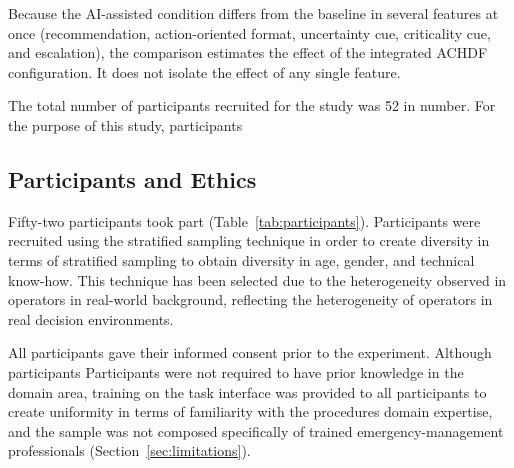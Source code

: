 \documentclass[journal]{IEEEtran}
\theoremstyle{plain}
\theoremstyle{definition}
\providecommand{\DIFaddtex}[1]{{\protect\color{blue} \sf #1}} %
\providecommand{\DIFdeltex}[1]{{\protect\color{red} \scriptsize #1}} %
\providecommand{\DIFaddbegin}{} %
\providecommand{\DIFaddend}{} %
\providecommand{\DIFdelbegin}{} %
\providecommand{\DIFdelend}{} %
\providecommand{\DIFadd}[1]{\texorpdfstring{\DIFaddtex{#1}}{#1}} %
\providecommand{\DIFdel}[1]{\texorpdfstring{\DIFdeltex{#1}}{}} %
\newcommand{\DIFscaledelfig}{0.5}
\newlength{\DIFdelgraphicswidth} %
\newlength{\DIFdelgraphicsheight} %
\newcommand{\DIFaddincludegraphics}[2][]{{\color{blue}\fbox{\DIFOincludegraphics[#1]{#2}}}} %
\newcommand{\DIFdelincludegraphics}[2][]{%
\sbox{\DIFdelgraphicsbox}{\DIFOincludegraphics[#1]{#2}}%
\settoboxwidth{\DIFdelgraphicswidth}{\DIFdelgraphicsbox} %
\settoboxtotalheight{\DIFdelgraphicsheight}{\DIFdelgraphicsbox} %
\scalebox{\DIFscaledelfig}{%
\parbox[b]{\DIFdelgraphicswidth}{\usebox{\DIFdelgraphicsbox}\\[-\baselineskip] \rule{\DIFdelgraphicswidth}{0em}}\llap{\resizebox{\DIFdelgraphicswidth}{\DIFdelgraphicsheight}{%
\setlength{\unitlength}{\DIFdelgraphicswidth}%
\begin{picture}(1,1)%
\thicklines\linethickness{2pt} %
{\color[rgb]{1,0,0}\put(0,0){\framebox(1,1){}}}%
{\color[rgb]{1,0,0}\put(0,0){\line( 1,1){1}}}%
{\color[rgb]{1,0,0}\put(0,1){\line(1,-1){1}}}%
\end{picture}%
}\hspace*{3pt}}} %
} %
\DeclareRobustCommand{\DIFaddbegin}{\DIFOaddbegin \let\includegraphics\DIFaddincludegraphics} %
\DeclareRobustCommand{\DIFaddend}{\DIFOaddend \let\includegraphics\DIFOincludegraphics} %
\DeclareRobustCommand{\DIFdelbegin}{\DIFOdelbegin \let\includegraphics\DIFdelincludegraphics} %
\DeclareRobustCommand{\DIFdelend}{\DIFOaddend \let\includegraphics\DIFOincludegraphics} %
\begin{document}






\DIFdelend \DIFaddbegin \DIFadd{Because the AI-assisted condition differs from the baseline in several features at once (recommendation, action-oriented format, uncertainty cue, criticality cue, and escalation), the comparison estimates the effect of the integrated ACHDF configuration. It does not isolate the effect of any single feature.
}\DIFaddend 

    \DIFdelbegin \DIFdel{The total number of participants recruited for the study was 52 in number. For the purpose of this study, participants }\DIFdelend \DIFaddbegin \subsection{\DIFadd{Participants and Ethics}}
    \label{sec:participants}

    \DIFadd{Fifty-two participants took part (Table~\ref{tab:participants}). Participants }\DIFaddend were recruited using \DIFdelbegin \DIFdel{the stratified sampling technique in order to create diversity in terms of }\DIFdelend \DIFaddbegin \DIFadd{stratified sampling to obtain diversity in }\DIFaddend age, gender, and technical \DIFdelbegin \DIFdel{know-how. This technique has been selected due to the heterogeneity observed in operators in real-world }\DIFdelend \DIFaddbegin \DIFadd{background, reflecting the heterogeneity of operators in real }\DIFaddend decision environments. \DIFdelbegin %

\DIFdel{All participants gave their informed consent prior to the experiment. Although participants }\DIFdelend \DIFaddbegin \DIFadd{Participants }\DIFaddend were not required to have prior \DIFdelbegin \DIFdel{knowledge in the domain area, training on the task interface was provided to all participants to create uniformity in terms of familiarity with the procedures}\DIFdelend \DIFaddbegin \DIFadd{domain expertise, and the sample was not composed specifically of trained emergency-management professionals (Section~\ref{sec:limitations}).
}
\end{document}
